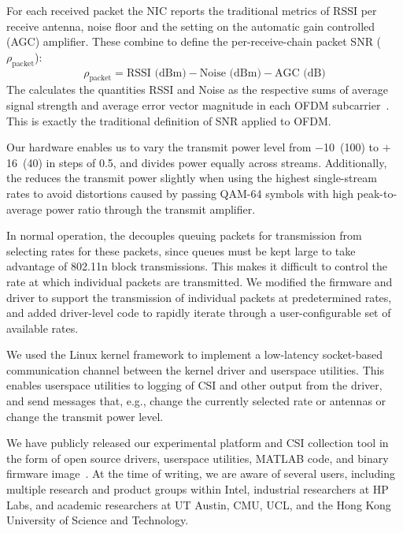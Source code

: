 For each received packet the NIC reports the traditional metrics of RSSI per receive antenna, noise floor and the setting on the automatic gain controlled (AGC) amplifier. These combine to define the per-receive-chain packet SNR ($\rho_{\text{packet}}$):
\begin{equation}
\label{eq:per_chain_snr}
	\rho_{\text{packet}} = \text{RSSI (dBm)} - \text{Noise (dBm)} - \text{AGC (dB)}
\end{equation}
The  calculates the quantities RSSI and Noise as the respective sums of average signal strength and average error vector magnitude in each OFDM subcarrier~\cite{iwlwifi}. This is exactly the traditional definition of SNR applied to OFDM\@.

 Our hardware enables us to vary the transmit power level from $-$10\dBm~(100\uW) to $+$16\dBm~(40\mW) in steps of 0.5\dB, and divides power equally across streams. Additionally, the  reduces the transmit power slightly when using the highest single-stream rates to avoid distortions caused by passing QAM-64 symbols with high peak-to-average power ratio through the transmit amplifier.

 In normal operation, the  decouples queuing packets for transmission from selecting rates for these packets, since queues must be kept large to take advantage of 802.11n block transmissions. This makes it difficult to control the rate at which individual packets are transmitted. We modified the firmware and driver to support the transmission of individual packets at predetermined rates, and added driver-level code to rapidly iterate through a user-configurable set of available rates.

 We used the Linux kernel  framework to implement a low-latency socket-based communication channel between the kernel driver and userspace utilities. This enables userspace utilities to logging of CSI and other output from the driver, and send messages that, e.g., change the currently selected rate or antennas or change the transmit power level.

 We have publicly released our experimental platform and CSI collection tool in the form of open source drivers, userspace utilities, MATLAB code, and binary firmware image~\cite{Halperin_csitool}. At the time of writing, we are aware of several users, including multiple research and product groups within Intel, industrial researchers at HP Labs, and academic researchers at UT Austin, CMU, UCL, and the Hong Kong University of Science and Technology.

